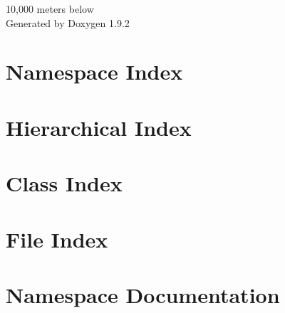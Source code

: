 \documentclass[twoside]{book}
\newcommand{\+}{\discretionary{\mbox{\scriptsize$\hookleftarrow$}}{}{}}
\newcommand{\clearemptydoublepage}{%
    \newpage{\pagestyle{empty}\cleardoublepage}%
  }
\begin{document}
  \raggedbottom
    \hypersetup{pageanchor=false,
                bookmarksnumbered=true,
                pdfencoding=unicode
               }
  \begin{titlepage}
  \vspace*{7cm}
  \begin{center}%
  {\Large 10,000 meters below}\\
  \vspace*{1cm}
  {\large Generated by Doxygen 1.9.2}\\
  \end{center}
  \end{titlepage}
  \clearemptydoublepage
  \tableofcontents
  \clearemptydoublepage
  \hypersetup{pageanchor=true}
\chapter{Namespace Index}

\chapter{Hierarchical Index}

\chapter{Class Index}

\chapter{File Index}

\chapter{Namespace Documentation}

















\end{document}
